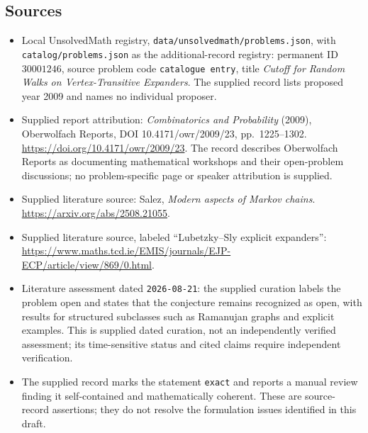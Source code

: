 \documentclass[11pt]{article}
\begin{document}
\subsection{Sources}
\begin{itemize}
\item Local UnsolvedMath registry, \texttt{data/unsolvedmath/problems.json}, with \texttt{catalog/problems.json} as the additional-record registry: permanent ID \(30001246\), source problem code \texttt{catalogue entry}, title \emph{Cutoff for Random Walks on Vertex-Transitive Expanders}. The supplied record lists proposed year 2009 and names no individual proposer.
\item Supplied report attribution: \emph{Combinatorics and Probability} (2009), Oberwolfach Reports, DOI 10.4171/owr/2009/23, pp.~1225--1302. \url{https://doi.org/10.4171/owr/2009/23}. The record describes Oberwolfach Reports as documenting mathematical workshops and their open-problem discussions; no problem-specific page or speaker attribution is supplied.
\item Supplied literature source: Salez, \emph{Modern aspects of Markov chains}. \url{https://arxiv.org/abs/2508.21055}.
\item Supplied literature source, labeled ``Lubetzky--Sly explicit expanders'': \url{https://www.maths.tcd.ie/EMIS/journals/EJP-ECP/article/view/869/0.html}.
\item Literature assessment dated \texttt{2026-08-21}: the supplied curation labels the problem open and states that the conjecture remains recognized as open, with results for structured subclasses such as Ramanujan graphs and explicit examples. This is supplied dated curation, not an independently verified assessment; its time-sensitive status and cited claims require independent verification.
\item The supplied record marks the statement \texttt{exact} and reports a manual review finding it self-contained and mathematically coherent. These are source-record assertions; they do not resolve the formulation issues identified in this draft.
\end{itemize}
\end{document}
